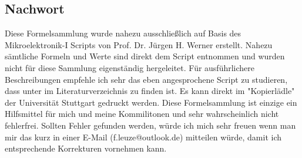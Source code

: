 \documentclass[12pt,a4paper]{article}%
\numberwithin{equation}{section}
\numberwithin{equation}{subsection}
\begin{document}
  \newpage
  \subsection{Nachwort}
  Diese Formelsammlung wurde nahezu ausschließlich auf Basis des Mikroelektronik-I Scripts von Prof. Dr. Jürgen H. Werner erstellt. Nahezu sämtliche Formeln und Werte sind direkt dem Script entnommen und wurden nicht für diese Sammlung eigenständig hergeleitet. Für ausführlichere Beschreibungen empfehle ich sehr das eben angesprochene Script zu studieren, dass unter \cite{Mikro1} im Literaturverzeichnis zu finden ist. Es kann direkt im "Kopierlädle" der Universität Stuttgart gedruckt werden. Diese Formelsammlung ist einzige ein Hilfsmittel für mich und meine Kommilitonen und sehr wahrscheinlich nicht fehlerfrei. Sollten Fehler gefunden werden, würde ich mich sehr freuen wenn man mir das kurz in einer E-Mail (f.leuze@outlook.de) mitteilen würde, damit ich entsprechende Korrekturen vornehmen kann. 
  

\end{document}
